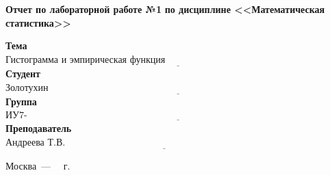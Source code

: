 \begin{titlepage}
	\begin{center}
		\noindent\begin{minipage}{1.1\textwidth}\centering
			\Large\textbf{  Отчет по лабораторной работе №1}\newline
			\textbf{по дисциплине <<Математическая статистика>>}\newline\newline
		\end{minipage}
	\end{center}
	
	\noindent\textbf{Тема} $\underline{\text{Гистограмма и эмпирическая функция распределения~~~~~~~~~~~~~~~~~~~~~~~~~~~~~~~~~~~~~~~~~~~}}$\newline\newline
	\noindent\textbf{Студент} $\underline{\text{Золотухин А.В.~~~~~~~~~~~~~~~~~~~~~~~~~~~~~~~~~~~~~~~~~~~~~~~~~~~~~~~~~~~~~~~~~~~~~~~~~~~~~~~~~~~~~~~~~}}$\newline\newline
	\noindent\textbf{Группа} $\underline{\text{ИУ7-64Б~~~~~~~~~~~~~~~~~~~~~~~~~~~~~~~~~~~~~~~~~~~~~~~~~~~~~~~~~~~~~~~~~~~~~~~~~~~~~~~~~~~~~~~~~~~~~~~~~~~~~}}$\newline\newline
	\noindent\textbf{Преподаватель} $\underline{\text{Андреева  Т.В.~~~~~~~~~~~~~~~~~~~~~~~~~~~~~~~~~~~~~~~~~~~~~~~~~~~~~~~~~~~~~~~~~~~~~~~~~~~~~~~~~}}$\newline\newline\newline
	
\begin{center}
	\vfill
	Москва~---~\the\year
	~г.
\end{center}

\end{titlepage}
